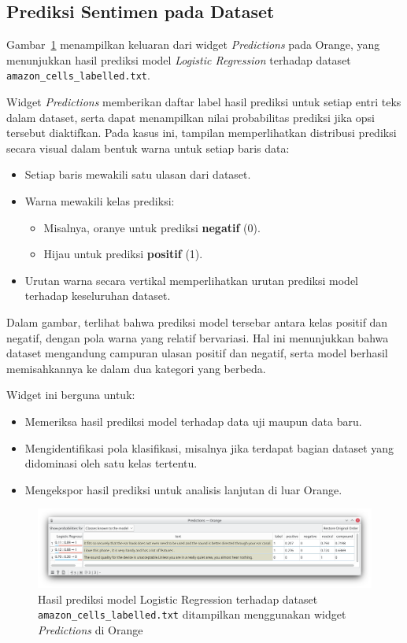 \subsection*{Prediksi Sentimen pada Dataset}

Gambar~\ref{fig:sentiment-predictions} menampilkan keluaran dari widget \textit{Predictions} pada Orange, yang menunjukkan hasil prediksi model \textit{Logistic Regression} terhadap dataset \texttt{amazon\_cells\_labelled.txt}.

Widget \textit{Predictions} memberikan daftar label hasil prediksi untuk setiap entri teks dalam dataset, serta dapat menampilkan nilai probabilitas prediksi jika opsi tersebut diaktifkan. Pada kasus ini, tampilan memperlihatkan distribusi prediksi secara visual dalam bentuk warna untuk setiap baris data:
\begin{itemize}
	\item Setiap baris mewakili satu ulasan dari dataset.
	\item Warna mewakili kelas prediksi:
	\begin{itemize}
		\item Misalnya, oranye untuk prediksi \textbf{negatif} (0).
		\item Hijau untuk prediksi \textbf{positif} (1).
	\end{itemize}
	\item Urutan warna secara vertikal memperlihatkan urutan prediksi model terhadap keseluruhan dataset.
\end{itemize}

Dalam gambar, terlihat bahwa prediksi model tersebar antara kelas positif dan negatif, dengan pola warna yang relatif bervariasi. Hal ini menunjukkan bahwa dataset mengandung campuran ulasan positif dan negatif, serta model berhasil memisahkannya ke dalam dua kategori yang berbeda.

Widget ini berguna untuk:
\begin{itemize}
	\item Memeriksa hasil prediksi model terhadap data uji maupun data baru.
	\item Mengidentifikasi pola klasifikasi, misalnya jika terdapat bagian dataset yang didominasi oleh satu kelas tertentu.
	\item Mengekspor hasil prediksi untuk analisis lanjutan di luar Orange.
\end{itemize}

\begin{figure}[h]
	\centering
	\includegraphics[width=\linewidth]{../figures/sentiment_prediction.png}
	\caption{Hasil prediksi model Logistic Regression terhadap dataset \texttt{amazon\_cells\_labelled.txt} ditampilkan menggunakan widget \textit{Predictions} di Orange}
	\label{fig:sentiment-predictions}
\end{figure}



